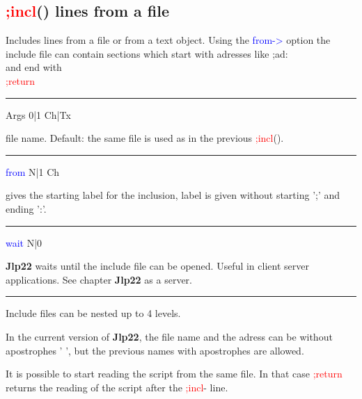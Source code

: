 \subsection{\textcolor{Red}{;incl}() lines from a file} 
\label{incl} 
Includes lines from a file or from a text object. Using the \textcolor{blue}{from->} 
option the include file can contain sections which start with adresses like 
;ad: \\ 
and end with \\ 
\textcolor{Red}{;return} 
\vspace{0.3cm} 
\hrule 
\vspace{0.3cm} 
\noindent Args  \tabto{3cm}  0|1  \tabto{5cm}   Ch|Tx  \tabto{7cm} 
\begin{changemargin}{3cm}{0cm} 
\noindent   file name. Default: the same file is used as in the previous \textcolor{Red}{;incl}(). 
\end{changemargin} 
\vspace{0.3cm} 
\hrule 
\vspace{0.3cm} 
\noindent \textcolor{blue}{from}  \tabto{3cm}  N|1  \tabto{5cm}   Ch  \tabto{7cm} 
\begin{changemargin}{3cm}{0cm} 
\noindent gives the starting label for the inclusion, label is given without starting ';' 
and ending ':'. 
\end{changemargin} 
\vspace{0.3cm} 
\hrule 
\vspace{0.3cm} 
\noindent \textcolor{blue}{wait} \tabto{3cm}  N|0  \tabto{5cm}    \tabto{7cm} 
\begin{changemargin}{3cm}{0cm} 
\noindent  \textbf{Jlp22} waits until the include file can be opened. Useful in client server applications. 
See chapter \textbf{Jlp22} as a server. 
\end {changemargin} 
\hrule 
\vspace{0.2cm} 
\begin{note} 
Include files can be nested up to 4 levels. 
\end{note} 
\begin{note} 
In the current version of \textbf{Jlp22}, the file name and the adress can be without apostrophes ' ', 
but the previous names with apostrophes are allowed. 
\end{note} 
\begin{note} 
It is possible to start reading the script from the same file. In that case \textcolor{Red}{;return} returns the reading of 
the script after the \textcolor{Red}{;incl}- line. 
\end{note} 
